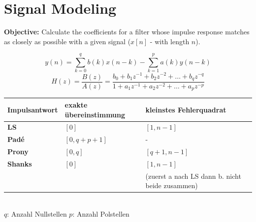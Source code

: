 \vspace{1em}
\begin{minipage}[t]{10cm}
  \vspace{-2cm}
  \section{Signal Modeling }
  \textbf{Objective: } Calculate the coefficients for a filter whose
  impulse response matches as closely as possible with a given signal ($x[n]$ - with
  length $n$).

      $$ y(n) = \sum\limits_{k=0}^{q} b(k)x(n-k) - \sum\limits_{k=1}^{p} a(k)y(n-k)$$
      $$ H(z) = \dfrac{B(z)}{A(z)} = \dfrac{b_0 + b_1z^{-1} + b_2 z^{-2} + \dots +
      b_q z^{-q}}{1 + a_1z^{-1} + a_2 z^{-2} + \dots + a_p z^{-p}} $$ 

\end{minipage}
\hspace{0.25cm}
\begin{minipage}{9cm}
	\begin{tabular}{| p{1.4cm} | p{2cm} | p{3.9cm} | }
	    \hline
	    \textbf{Impuls\-antwort}
	    & exakte über\-ein\-stimmung
	    & kleinstes Fehler\-quadrat \\
	    \hline
	    \hline
	    \textbf{LS} 
	    & $[0]$
	    & $[1, n - 1]$\\
	    \hline
	    \textbf{Padé} 
	    & $[0, q + p + 1]$
	    & -\\
	    \hline
	    \textbf{Prony} 
	    & $[0, q]$
	    & $[q + 1, n-1]$ \\
	    \hline
	    \textbf{Shanks} 
	    & $[0]$
	    & $[1, n - 1]$\\
	    &&(zuerst a nach LS dann b. nicht beide zusammen)\\
	    \hline
	\end{tabular}\\
	$q$: Anzahl Nullstellen \hspace{1cm} $p$: Anzahl Polstellen
\end{minipage}

